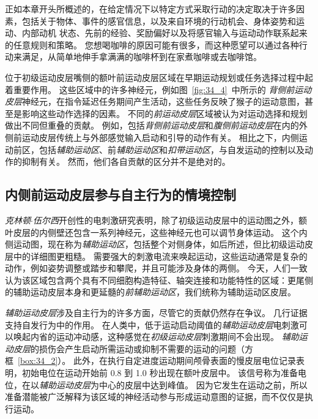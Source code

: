 正如本章开头所概述的，在给定情况下以特定方式采取行动的决定取决于许多因素，包括关于物体、事件的感官信息，以及来自环境的行动机会、身体姿势和运动、内部动机 状态、先前的经验、奖励偏好以及将感官输入与运动动作联系起来的任意规则和策略。
您想喝咖啡的原因可能有很多，而这种愿望可以通过各种行动来满足，从简单地伸手拿满满的咖啡杯到在家煮咖啡或去咖啡馆。


位于初级运动皮层嘴侧的额叶前运动皮层区域在早期运动规划或任务选择过程中起着重要作用。
这些区域中的许多神经元，例如图~\ref{fig:34_4}~中所示的 \textit{背侧前运动皮层}神经元，在指令延迟任务期间产生活动，这些任务反映了猴子的运动意图，甚至是影响这些动作选择的因素。
不同的\textit{前运动皮层}区域被认为对运动选择和规划做出不同但重叠的贡献。
例如，包括\textit{背侧前运动皮层}和\textit{腹侧前运动皮层}在内的外侧前运动皮层传统上与外部感觉输入启动和引导的动作有关。
相比之下，内侧运动前区，包括\textit{辅助运动区}、前\textit{辅助运动区}和\textit{扣带运动区}，与自发运动的控制以及动作的抑制有关。
然而，他们各自贡献的区分并不是绝对的。



\subsection{内侧前运动皮层参与自主行为的情境控制}

\textit{克林顿$\cdot$伍尔西}开创性的电刺激研究表明，除了初级运动皮层中的运动图之外，额叶皮层的内侧壁还包含一系列神经元，这些神经元也可以调节身体运动。
这个内侧运动图，现在称为\textit{辅助运动区}，包括整个对侧身体，如后所述，但比初级运动皮层中的详细图更粗糙。
需要强大的刺激电流来唤起运动，这些运动通常是复杂的动作，例如姿势调整或踏步和攀爬，并且可能涉及身体的两侧。
今天，人们一致认为该区域包含两个具有不同细胞构造特征、轴突连接和功能特性的区域：更尾侧的辅助运动皮层本身和更延髓的\textit{前辅助运动区}，我们统称为辅助运动区皮层。


\textit{辅助运动皮层}涉及自主行为的许多方面，尽管它的贡献仍然存在争议。
几行证据支持自发行为中的作用。
在人类中，低于运动启动阈值的\textit{辅助运动皮层}电刺激可以唤起内省的运动冲动感，这种感觉在\textit{初级运动皮层}刺激期间不会出现。
\textit{辅助运动皮层}的损伤会产生启动所需运动或抑制不需要的运动的问题（方框~\ref{box:34_2}）。
此外，在执行自定进度运动期间颅骨表面的慢皮层电位记录表明，初始电位在运动开始前 0.8 到 1.0 秒出现在额叶皮层中。
该信号称为准备电位，在以\textit{辅助运动皮层}为中心的皮层中达到峰值。
因为它发生在运动之前，所以准备潜能被广泛解释为该区域的神经活动参与形成运动意图的证据，而不仅仅是执行运动。



